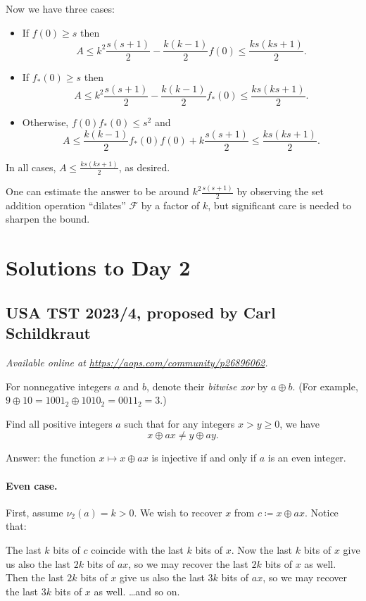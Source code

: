 \documentclass[11pt]{scrartcl}
\begin{document}
Now we have three cases:
\begin{itemize}
  \item If $f(0)\geq s$ then
    \[
      A\leq k^2 \frac{s(s+1)}{2} - \frac{k(k-1)}{2}f(0) \leq \frac{ks(ks+1)}{2}.
    \]
  \item If $f_*(0)\geq s$ then
    \[
      A\leq k^2 \frac{s(s+1)}{2} - \frac{k(k-1)}{2}f_*(0) \leq \frac{ks(ks+1)}{2}.
    \]
  \item Otherwise, $f(0)f_*(0) \leq s^2$ and
    \[
      A\leq \frac{k(k-1)}{2} f_*(0)f(0) + k\frac{s(s+1)}{2} \leq \frac{ks(ks+1)}{2}.
    \]
\end{itemize}

\medskip

In all cases, $A \leq \frac{ks(ks+1)}{2}$, as desired.

\begin{remark*}
  One can estimate the answer to be around $k^2 \frac{s(s+1)}{2}$ by
  observing the set addition operation ``dilates'' $\mathcal{F}$ by a factor of
  $k$, but significant care is needed to sharpen the bound.
\end{remark*}
\pagebreak

\section{Solutions to Day 2}
\subsection{USA TST 2023/4, proposed by Carl Schildkraut}
\textsl{Available online at \url{https://aops.com/community/p26896062}.}
\begin{mdframed}[style=mdpurplebox,frametitle={Problem statement}]
For nonnegative integers $a$ and $b$,
denote their \emph{bitwise xor} by $a \oplus b$.
(For example, $9 \oplus 10 = 1001_2 \oplus 1010_2 = 0011_2 = 3$.)

Find all positive integers $a$ such that
for any integers $x > y \ge 0$, we have
\[ x \oplus ax \neq y \oplus ay.  \]
\end{mdframed}
Answer: the function $x \mapsto x \oplus ax$ is injective if and only if
$a$ is an even integer.

\paragraph{Even case.}
First, assume $\nu_2(a) = k > 0$.
We wish to recover $x$ from $c \coloneqq x \oplus ax$.
Notice that:
\begin{itemize}
  \ii The last $k$ bits of $c$ coincide with the last $k$ bits of $x$.
  \ii Now the last $k$ bits of $x$ give us also the last $2k$ bits of $ax$,
  so we may recover the last $2k$ bits of $x$ as well.
  \ii Then the last $2k$ bits of $x$ give us also the last $3k$ bits of $ax$,
  so we may recover the last $3k$ bits of $x$ as well.
  \ii \dots and so on.
\end{itemize}
\end{document}
